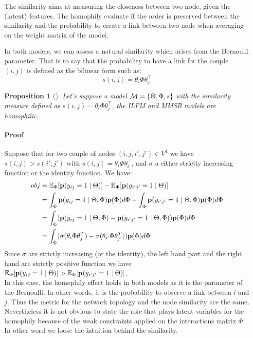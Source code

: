 \documentclass[a4paper, 12pt]{article}
\newtheorem{proposition}{Proposition}[section]
\begin{document}
The similarity aims at measuring the closeness between two node, given the (latent) features. The homophily evaluate if the order is preserved between the similarity and the probability to create a link between two node when averaging on the weight matrix of the model.

In both models, we can assess a natural similarity which arises from the Bernoulli parameter. That is to say that the probability to have a link for the couple $(i,j)$ is defined as the bilinear form such as: 
\begin{equation}
s(i,j) = \theta_i \Phi \theta_j^\top
\end{equation}

\begin{proposition}[]
Let's suppose a model $ \mathcal{M}=\{\Theta, \Phi, s\}$ with the similarity measure defined as $s(i,j) = \theta_i \Phi \theta_j^\top$, the ILFM and MMSB models are homophilic.
\end{proposition}
\paragraph{Proof} 
Suppose that for two couple of nodes $(i,j,i',j') \in V^4$ we have $s(i,j) > s(i',j')$ with $s(i,j) =\theta_i \Phi \theta_j^\top$, and $\sigma$ a either strictly increasing function or the identity function. We have:
\begin{align}
obj &=\mathbb{E}_\Phi[\mathbf{p}(y_{ij}=1 \mid \Theta)] - \mathbb{E}_\Phi[\mathbf{p}(y_{i'j'} = 1  \mid \Theta)] \\
&= \int_{\Phi} \mathbf{p}(y_{ij}=1 \mid \Theta, \Phi ) \mathbf{p}(\Phi) d\Phi - \int_{\Phi}\mathbf{p}(y_{i'j'}=1 \mid \Theta, \Phi ) \mathbf{p}(\Phi) d\Phi \\
&= \int_\Phi ( \mathbf{p}(y_{ij}=1 \mid \Theta, \Phi )  - \mathbf{p}(y_{i'j'}=1 \mid \Theta, \Phi ) )\mathbf{p}(\Phi) d\Phi \\
&=  \int_\Phi ( \sigma(\theta_i \Phi  \theta_j^T) -\sigma(\theta_{i'} \Phi  \theta_{j'}^T) )\mathbf{p}(\Phi) d\Phi
\end{align}
Since $\sigma$ are strictly increasing (or the identity), the left hand part and the right hand are strictly positive function we have $\mathbb{E}_\Phi[\mathbf{p}(y_{ij}=1 \mid \Theta)] > \mathbb{E}_\Phi[\mathbf{p}(y_{i'j'} = 1  \mid \Theta)]$.~\\


In this case, the homophily effect holds in both models as it is the parameter of the Bernoulli. In other words, it is the probability to observe a link between $i$ and $j$. Thus the metric for the network topology and the node similarity are the same. Nevertheless it is not obvious to state the role that plays latent variables for the homophily because of the weak constraints applied on the interactions matrix $\Phi$. In other word we loose the intuition behind the similarity. ~\\
\end{document}
